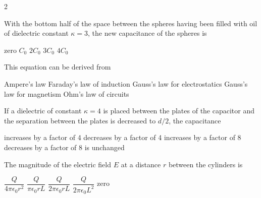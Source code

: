 \documentclass{../../../oss-apphys-exam}
\begin{document}
\begin{multicols*}{2}
\begin{questions}
    \question With the bottom half of the space between the spheres having been
    filled with oil of dielectric constant $\kappa=3$, the new capacitance of
    the spheres is
    \label{cap2}
    \begin{choices}
      \choice zero
      \choice $C_0$
      \choice $2C_0$
      \choice $3C_0$
      \choice $4C_0$
    \end{choices}


    \question This equation can be derived from
    \begin{choices}
      \choice Ampere's law
      \choice Faraday's law of induction
      \choice Gauss's law for electrostatics
      \choice Gauss's law for magnetism
      \choice Ohm's law of circuits
    \end{choices}
    \label{plate1}
    \vspace{.7in}
    
    \question If a dielectric of constant $\kappa=4$ is placed between the
    plates of the capacitor and the separation between the plates is decreased
    to $d/2$, the capacitance
    \begin{choices}
      \choice increases by a factor of 4
      \choice decreases by a factor of 4
      \choice increases by a factor of 8
      \choice decreases by a factor of 8
      \choice is unchanged
    \end{choices}
    \label{plate2}
    \columnbreak
    

    \question The magnitude of the electric field $E$ at a distance $r$ between
    the cylinders is
    \begin{choices}
      \choice $\dfrac Q{4\pi\epsilon_0r^2}$
      \choice $\dfrac Q{\pi\epsilon_0rL}$
      \choice $\dfrac Q{2\pi\epsilon_0rL}$
      \choice $\dfrac Q{2\pi\epsilon_0L^2}$
      \choice zero
    \end{choices}
    \label{cyl1}
    \columnbreak
    

\end{questions}
\end{multicols*}
\end{document}
